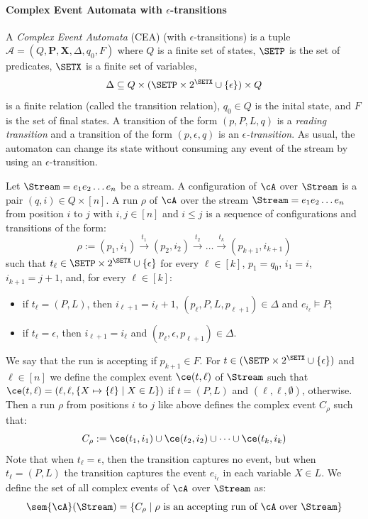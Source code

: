 \paragraph{Complex Event Automata with $\epsilon$-transitions} A \textit{Complex Event Automata} (CEA) (with $\epsilon$-transitions) is a tuple $
\mathcal{A} = (Q,\textbf{P},\textbf{X},\Delta,q_0,F)
$
where $Q$ is a finite set of states, $\SETP$ is the set of predicates, $\SETX$ is a finite set of variables,
\[
\Delta \subseteq Q \times (\SETP \times 2^{\SETX} \cup \{\epsilon\}) \times Q  
\] is a finite relation (called the transition relation), $q_0 \in Q$ is the inital state, and $F$ is the set of final states. A transition of the form $(p, P, L, q)$ is a \emph{reading transition} and a transition of the form $(p, \epsilon, q)$ is an \emph{$\epsilon$-transition}. As usual, the automaton can change its state without consuming any event of the stream by using an $\epsilon$-transition.

Let $\Stream = e_1 e_2 \ldots e_n$ be a stream. A configuration of $\cA$ over $\Stream$ is a pair $(q, i) \in Q \times [n]$.
A run $\rho$ of $\cA$ over the stream $\Stream = e_1 e_2 \dots e_n$ from position $i$ to $j$ with $i, j \in [n]$ and $i \leq j$ is a sequence of configurations and transitions of the form:
\[ 
\rho := (p_1, i_1) \xrightarrow{t_1} (p_{2}, i_2) \xrightarrow{t_2} \dots \xrightarrow{t_k} (p_{k+1}, i_{k+1}) 
\]
such that $t_\ell \in \SETP \times 2^{\SETX} \cup \{\epsilon\}$ for every $\ell \in [k]$, $p_1 = q_0$, $i_1 = i$, $i_{k+1} = j+1$, and, for every $\ell \in [k]$:
\begin{itemize}
	\item if $t_\ell = (P, L)$, then $i_{\ell+1} = i_{\ell}+1$, $(p_{\ell}, P, L, p_{\ell+1}) \in \Delta$ and $e_{i_{\ell}} \vDash P$;
	\item if $t_\ell = \epsilon$, then $i_{\ell+1} = i_{\ell}$ and $(p_{\ell}, \epsilon, p_{\ell+1}) \in \Delta$.
\end{itemize}
We say that the run is accepting if $p_{k+1} \in F$.
For $t \in (\SETP \times 2^{\SETX} \cup \{\epsilon\})$ and $\ell \in [n]$ we define the complex event $\ce(t, \ell)$ of $\Stream$ such that $\ce(t, \ell) = (\ell, \ell, \{X \mapsto \{\ell\} \mid X \in L\})$ if $t = (P,L)$ and $(\ell, \ell, \emptyset)$, otherwise.
Then a run $\rho$ from positions $i$ to $j$ like above defines the complex event $C_\rho$ such that:
\[
C_\rho := \ce(t_1, i_1) \cup \ce(t_2, i_2) \cup \dots \cup \ce(t_k, i_k)
\]
Note that when $t_\ell = \epsilon$, then the transition captures no event, but when $t_\ell = (P, L)$ the transition captures the event $e_{i_\ell}$ in each variable $X \in L$. We define the set of all complex events of $\cA$ over $\Stream$ as:  
\[ \sem{\cA}(\Stream) = \{C_\rho \mid \rho \text{ is an accepting run of } \cA \text{ over } \Stream\} \]
